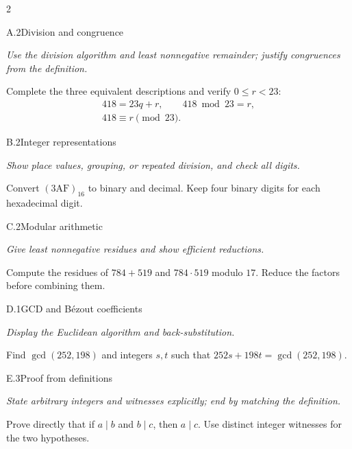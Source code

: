 \documentclass[9pt]{extarticle}
\begin{document}
\begin{multicols}{2}
\begin{CoreProblem}{A.2}{Division and congruence}
{\scriptsize\textit{Use the division algorithm and least nonnegative remainder; justify congruences from the definition.}\par}
Complete the three equivalent descriptions and verify $0\le r<23$:
\[
\begin{gathered}
418=23q+r,\qquad 418\bmod 23=r,\\
418\equiv r\pmod{23}.
\end{gathered}
\]
\end{CoreProblem}
\begin{CoreProblem}{B.2}{Integer representations}
{\scriptsize\textit{Show place values, grouping, or repeated division, and check all digits.}\par}
Convert $(\mathrm{3AF})_{16}$ to binary and decimal. Keep four binary digits
for each hexadecimal digit.
\end{CoreProblem}
\begin{CoreProblem}{C.2}{Modular arithmetic}
{\scriptsize\textit{Give least nonnegative residues and show efficient reductions.}\par}
Compute the residues of $784+519$ and $784\cdot519$ modulo $17$. Reduce the
factors before combining them.
\end{CoreProblem}
\columnbreak
\begin{CoreProblem}{D.1}{GCD and B\'ezout coefficients}
{\scriptsize\textit{Display the Euclidean algorithm and back-substitution.}\par}
Find $\gcd(252,198)$ and integers $s,t$ such that
$252s+198t=\gcd(252,198)$.
\end{CoreProblem}
\begin{CoreProblem}{E.3}{Proof from definitions}
{\scriptsize\textit{State arbitrary integers and witnesses explicitly; end by matching the definition.}\par}
Prove directly that if $a\mid b$ and $b\mid c$, then $a\mid c$. Use distinct
integer witnesses for the two hypotheses.
\end{CoreProblem}
\end{multicols}
\CoreWorkArea
\FormBreak
{}
\end{document}
